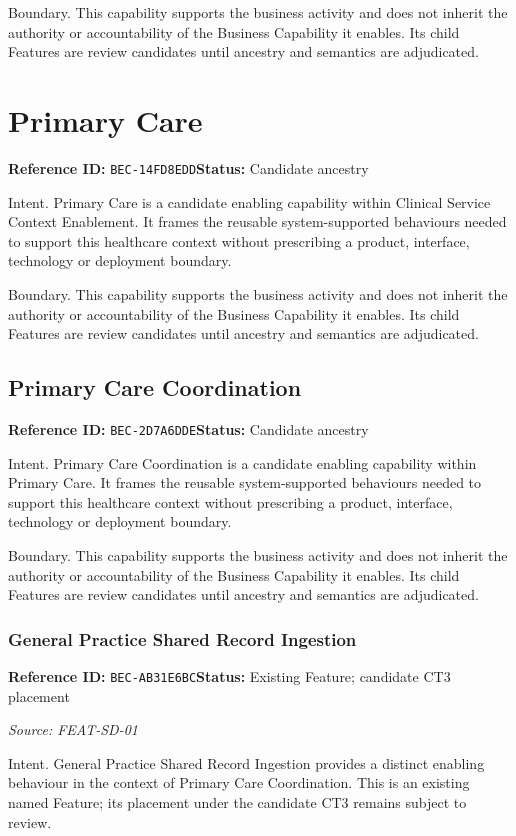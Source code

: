 \documentclass[11pt,a4paper,openany]{book}
\begin{document}
Boundary. This capability supports the business activity and does not inherit the authority or accountability of the Business Capability it enables. Its child Features are review candidates until ancestry and semantics are adjudicated.

\section{Primary Care}\label{cap:bec-14fd8edd}
\noindent\textbf{Reference ID:} \texttt{BEC-14FD8EDD}\quad \textbf{Status:} Candidate ancestry\par
Intent. Primary Care is a candidate enabling capability within Clinical Service Context Enablement. It frames the reusable system-supported behaviours needed to support this healthcare context without prescribing a product, interface, technology or deployment boundary.

Boundary. This capability supports the business activity and does not inherit the authority or accountability of the Business Capability it enables. Its child Features are review candidates until ancestry and semantics are adjudicated.

\subsection{Primary Care Coordination}\label{cap:bec-2d7a6dde}
\noindent\textbf{Reference ID:} \texttt{BEC-2D7A6DDE}\quad \textbf{Status:} Candidate ancestry\par
Intent. Primary Care Coordination is a candidate enabling capability within Primary Care. It frames the reusable system-supported behaviours needed to support this healthcare context without prescribing a product, interface, technology or deployment boundary.

Boundary. This capability supports the business activity and does not inherit the authority or accountability of the Business Capability it enables. Its child Features are review candidates until ancestry and semantics are adjudicated.

\subsubsection{General Practice Shared Record Ingestion}\label{cap:bec-ab31e6bc}
\noindent\textbf{Reference ID:} \texttt{BEC-AB31E6BC}\quad \textbf{Status:} Existing Feature; candidate CT3 placement\par
\noindent\textit{Source: FEAT-SD-01}\par
Intent. General Practice Shared Record Ingestion provides a distinct enabling behaviour in the context of Primary Care Coordination. This is an existing named Feature; its placement under the candidate CT3 remains subject to review.
\end{document}
